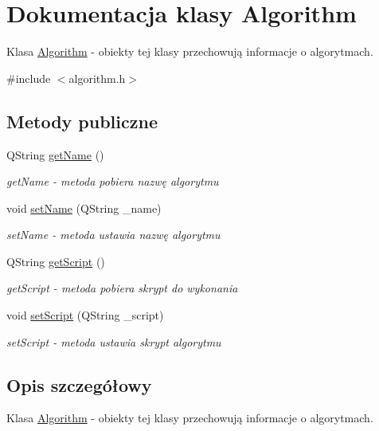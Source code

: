 \hypertarget{class_algorithm}{\section{Dokumentacja klasy Algorithm}
\label{class_algorithm}
}


Klasa \hyperlink{class_algorithm}{Algorithm} -\/ obiekty tej klasy przechowują informacje o algorytmach.  




{\ttfamily \#include $<$algorithm.\+h$>$}

\subsection*{Metody publiczne}
\begin{DoxyCompactItemize}
\item 
Q\+String \hyperlink{class_algorithm_a5cd4793c1caa46a89884fcf1c92e5677}{get\+Name} ()
\begin{DoxyCompactList}\small\item\em get\+Name -\/ metoda pobiera nazwę algorytmu \end{DoxyCompactList}\item 
void \hyperlink{class_algorithm_a68542c56278158175c3d25f2e9325f89}{set\+Name} (Q\+String \+\_\+name)
\begin{DoxyCompactList}\small\item\em set\+Name -\/ metoda ustawia nazwę algorytmu \end{DoxyCompactList}\item 
Q\+String \hyperlink{class_algorithm_a8b5ecdf1f5be5996d77a5939622f7ca4}{get\+Script} ()
\begin{DoxyCompactList}\small\item\em get\+Script -\/ metoda pobiera skrypt do wykonania \end{DoxyCompactList}\item 
void \hyperlink{class_algorithm_a7d15e1a191268e75c249129da8787dc1}{set\+Script} (Q\+String \+\_\+script)
\begin{DoxyCompactList}\small\item\em set\+Script -\/ metoda ustawia skrypt algorytmu \end{DoxyCompactList}\end{DoxyCompactItemize}


\subsection{Opis szczegółowy}
Klasa \hyperlink{class_algorithm}{Algorithm} -\/ obiekty tej klasy przechowują informacje o algorytmach. 


